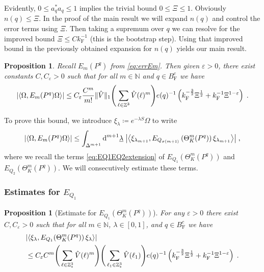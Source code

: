 \documentclass[12pt,a4paper]{article}
\numberwithin{equation}{section}
\newcommand{\NNN}{\mathbb{N}}
\newcommand{\1}{\mathbb{I}}
\newcommand{\di}{\textnormal{d}}
\newcommand{\F}{\mathrm{F}}
\newcommand{\kF}{k_\F}
\newcommand{\Z}{\mathbb{Z}}
\newcommand{\half}{\frac{1}{2}}
\newcommand{\eva}[1]{\left\langle #1 \right\rangle}
\theoremstyle{plain}
\newtheorem{proposition}[theorem]{Proposition}
\theoremstyle{definition}
\theoremstyle{remark}
\theoremstyle{plain}
\theoremstyle{definition}
\theoremstyle{remark}
\begin{document}
Evidently, $ 0 \le a_q^* a_q \le 1 $ implies the trivial bound $ 0 \le \Xi \le 1 $. Obviously $n(q) \leq \Xi$. In the proof of the main result we will expand $n(q)$ and control the error terms using $\Xi$. Then taking a supremum over $q$ we can resolve for the improved bound $\Xi \leq C \kF^{-1}$ (this is the bootstrap step). Using that improved bound in the previously obtained expansion for $n(q)$ yields our main result.

\begin{proposition} \label{prop:finalEmest}
Recall $E_m(P^q)$ from \eqref{eq:errEm}. Then given $ \varepsilon > 0 $, there exist constants $ C, C_\varepsilon > 0 $ such that for all $ m \in \NNN $ and $ q \in B_{\F}^c $ we have
\begin{equation} \label{eq:finalEmest}
	\abs{\eva{\Omega, E_m(P^q) \Omega}}
	\leq C_\varepsilon \frac{C^m}{m!} \Vert \hat{V} \Vert_1
		\Bigg( \sum_{\ell \in \Z^3} \hat{V}(\ell)^m \Bigg)
		e(q)^{-1} \left( k_{\F}^{-\frac{3}{2}} \Xi^\half
		+ k_{\F}^{-1}\Xi^{1-\varepsilon} \right) \;.
\end{equation}
\end{proposition}
To prove this bound, we introduce $ \xi_\lambda \coloneq e^{- \lambda S} \Omega $ to write
\begin{equation} \label{eq:errEm2}
	\abs{\eva{\Omega, E_m(P^q) \Omega }}
	\le \int_{\Delta^{m+1}} \di^{m+1} \underline{\lambda} \;
		\abs{\eva{\xi_{\lambda_{m+1}}, E_{Q_{\sigma(m+1)}}\left(\Theta^{m}_{K}(P^q)\right) \xi_{\lambda_{m+1}}}} \;,
\end{equation}
where we recall the terms \eqref{eq:EQ1EQ2extension} of $ E_{Q_1}(\Theta^m_{K}(P^q)) $ and $ E_{Q_2}(\Theta^m_{K}(P^q)) $. We will consecutively estimate these terms.



\subsubsection{Estimates for $E_{Q_1}$}

\begin{proposition}[Estimate for $E_{Q_1}(\Theta^m_{K}(P^q))$]\label{prop:finEQ1est}
For any $ \varepsilon > 0 $ there exist $ C, C_\varepsilon > 0 $ such that for all $ m \in \NNN $, $ \lambda \in [0,1] $, and $ q \in B_{\F}^c $ we have
\begin{equation} \label{eq:finalEQ1est}
\begin{split}
	&\abs{\eva{\xi_\lambda, E_{Q_1}\!\left(\Theta^m_K(P^q)\right) \xi_\lambda}} \\
	&\leq C_\varepsilon C^m \Bigg(\sum_{\ell \in \Z^3_*} \hat{V}(\ell)^m\Bigg)
		\Bigg( \sum_{\ell_1 \in \Z^3_*} \hat{V}(\ell_1) \Bigg)
		e(q)^{-1} \left( k_{\F}^{-\frac{3}{2}} \Xi^\half + k_{\F}^{-1}\Xi^{1-\varepsilon} \right) \;.
\end{split}
\end{equation}
\end{proposition}
\end{document}
